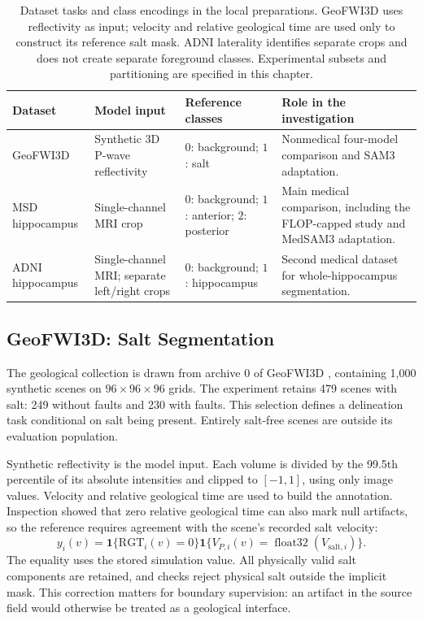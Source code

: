 \documentclass[12pt,a4paper]{article}
\begin{document}
\begin{table}[htbp]
\centering
\small
{}
\renewcommand{\arraystretch}{1.2}
\begin{tabular}{P{2.65cm}P{3.15cm}P{3.65cm}P{4.1cm}}
\hline
Dataset & Model input & Reference classes & Role in the investigation \\
\hline
GeoFWI3D & Synthetic 3D P-wave reflectivity &
$0$: background; $1$: salt &
Nonmedical four-model comparison and SAM3 adaptation. \\[0.4em]
MSD hippocampus & Single-channel MRI crop &
$0$: background; $1$: anterior; $2$: posterior &
Main medical comparison, including the FLOP-capped study and MedSAM3 adaptation. \\[0.4em]
ADNI hippocampus & Single-channel MRI; separate left/right crops &
$0$: background; $1$: hippocampus &
Second medical dataset for whole-hippocampus segmentation. \\
\hline
\end{tabular}
\caption{Dataset tasks and class encodings in the local preparations.
GeoFWI3D uses reflectivity as input; velocity and relative geological time
are used only to construct its reference salt mask. ADNI laterality
identifies separate crops and does not create separate foreground classes.
Experimental subsets and partitioning are specified in this chapter.}
\label{tab:dataset-task-overview}
\end{table}


\FloatBarrier
\subsection{GeoFWI3D: Salt Segmentation}
\label{sec:geo-methods}


The geological collection is drawn from archive 0 of GeoFWI3D
\cite{swaminadhan2026geofwi3d}, containing 1,000 synthetic scenes on
$96\times96\times96$ grids. The experiment retains 479 scenes with
salt: 249 without faults and 230 with faults. This selection defines
a delineation task conditional on salt being present. Entirely
salt-free scenes are outside its evaluation population.

Synthetic reflectivity is the model input. Each volume is divided by
the 99.5th percentile of its absolute intensities and clipped to
$[-1,1]$, using only image values. Velocity and relative geological
time are used to build the annotation. Inspection showed that zero
relative geological time can also mark null artifacts, so the reference
requires agreement with the scene's recorded salt velocity:
\begin{equation}
 y_i(v)=\mathbf{1}\{\mathrm{RGT}_i(v)=0\}
        \mathbf{1}\{V_{P,i}(v)=\operatorname{float32}(V_{\mathrm{salt},i})\}.
\label{eq:geo-reference-construction}
\end{equation}
The equality uses the stored simulation value. All physically valid
salt components are retained, and checks reject physical salt outside
the implicit mask. This correction matters for boundary supervision:
an artifact in the source field would otherwise be treated as a
geological interface.
\end{document}
